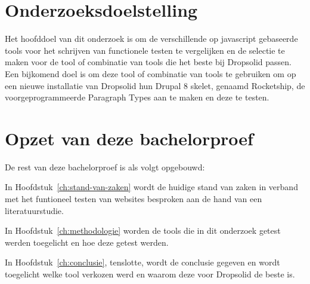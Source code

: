 \section{Onderzoeksdoelstelling}
\label{sec:onderzoeksdoelstelling}
Het hoofddoel van dit onderzoek is om de verschillende op javascript gebaseerde tools voor het schrijven van functionele testen te vergelijken en de selectie te maken voor de tool of combinatie van tools die het beste bij Dropsolid passen. Een bijkomend doel is om deze tool of combinatie van tools te gebruiken om op een nieuwe installatie van Dropsolid hun Drupal 8 skelet, genaamd Rocketship, de voorgeprogrammeerde \gls{Paragraph Types} aan te maken en deze te testen.



\section{Opzet van deze bachelorproef}
\label{sec:opzet-bachelorproef}


De rest van deze bachelorproef is als volgt opgebouwd:

In Hoofdstuk~\ref{ch:stand-van-zaken} wordt de huidige stand van zaken in verband met het funtioneel testen van websites besproken aan de hand van een literatuurstudie.

In Hoofdstuk~\ref{ch:methodologie} worden de tools die in dit onderzoek getest werden toegelicht en hoe deze getest werden.


In Hoofdstuk~\ref{ch:conclusie}, tenslotte, wordt de conclusie gegeven en wordt toegelicht welke tool verkozen werd en waarom deze voor Dropsolid de beste is.

